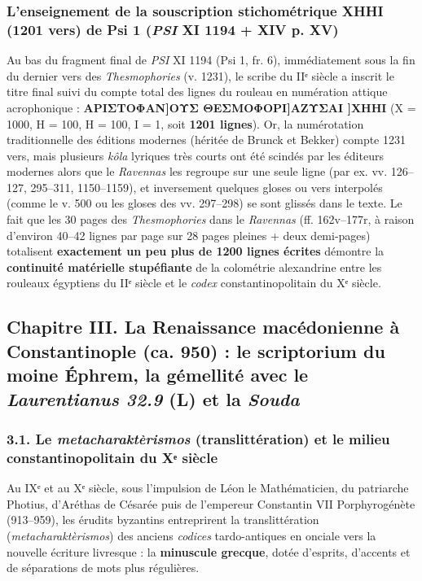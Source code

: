 \documentclass[11pt, a4paper, twoside]{article}
\renewcommand{\_}{\origunderscore\penalty0\relax}
\renewcommand{\texttt}[1]{#1}
\newcommand{\PsiUn}{\textgreek{Ψ}\textsuperscript{1}}
\def\PsiUn{Psi 1}%
\begin{document}
\subsubsection{L'enseignement de la souscription stichométrique \texttt{ΧΗΗΙ} (1201 vers) de \PsiUn{} (\textit{PSI} XI 1194 + XIV p. XV)}

Au bas du fragment final de \textit{PSI} XI 1194 (\PsiUn{}, fr. 6), immédiatement sous la fin du dernier vers des \textit{Thesmophories} (\texttt{v. 1231}), le scribe du IIᵉ siècle a inscrit le titre final suivi du compte total des lignes du rouleau en numération attique acrophonique : \textbf{\texttt{ΑΡΙΣΤΟΦΑΝ]\allowbreak ΟΥΣ ΘΕΣΜΟΦΟΡΙ]\allowbreak ΑΖΥΣΑΙ ]ΧΗΗΙ}} (Χ = 1000, Η = 100, Η = 100, Ι = 1, soit \textbf{1201 lignes}). Or, la numérotation traditionnelle des éditions modernes (héritée de Brunck et Bekker) compte 1231 vers, mais plusieurs \textit{kôla} lyriques très courts ont été scindés par les éditeurs modernes alors que le \textit{Ravennas} les regroupe sur une seule ligne (par ex. \texttt{vv. 126–127}, \texttt{295–311}, \texttt{1150–1159}), et inversement quelques gloses ou vers interpolés (comme le v. 500 ou les gloses des vv. 297–298) se sont glissés dans le texte. Le fait que les 30 pages des \textit{Thesmophories} dans le \textit{Ravennas} (\texttt{ff. 162v–177r}, à raison d'environ 40–42 lignes par page sur 28 pages pleines + deux demi-pages) totalisent \textbf{exactement un peu plus de 1200 lignes écrites} démontre la \textbf{continuité matérielle stupéfiante} de la colométrie alexandrine entre les rouleaux égyptiens du IIᵉ siècle et le \textit{codex} constantinopolitain du Xᵉ siècle.



\subsection{Chapitre III. La Renaissance macédonienne à Constantinople (ca. 950) : le scriptorium du moine Éphrem, la gémellité avec le \textit{Laurentianus 32.9} (\textnormal{L}) et la \textit{Souda}}


\subsubsection{3.1. Le \textit{metacharaktèrismos} (translittération) et le milieu constantinopolitain du Xᵉ siècle}

Au IXᵉ et au Xᵉ siècle, sous l'impulsion de Léon le Mathématicien, du patriarche Photius, d'Aréthas de Césarée puis de l'empereur Constantin VII Porphyrogénète (913–959), les érudits byzantins entreprirent la translittération (\textit{metacharaktèrismos}) des anciens \textit{codices} tardo-antiques en onciale vers la nouvelle écriture livresque : la \textbf{minuscule grecque}, dotée d'esprits, d'accents et de séparations de mots plus régulières.
\end{document}
